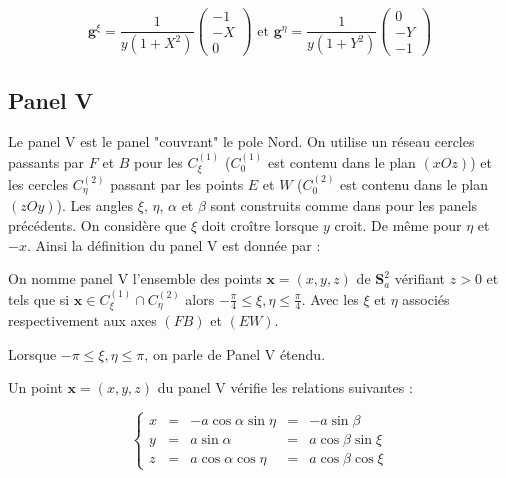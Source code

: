 \begin{equation}
\mathbf{g}^{\xi} = \dfrac{1}{y(1+X^2)}\begin{pmatrix}
-1 \\ -X \\ 0
\end{pmatrix} \text{ et } \mathbf{g}^{\eta} = \dfrac{1}{y(1+Y^2)}\begin{pmatrix}
0 \\ -Y \\ -1
\end{pmatrix}
\label{eq: base duale IV}
\end{equation}













\subsection{Panel V}

Le panel V est le panel "couvrant" le pole Nord. On utilise un réseau cercles passants par $F$ et $B$ pour les $C_{\xi}^{(1)}$ ($C_{0}^{(1)}$ est contenu dans le plan $(xOz)$) et les cercles $C_{\eta}^{(2)}$ passant par les points $E$ et $W$ ($C_{0}^{(2)}$ est contenu dans le plan $(zOy)$). Les angles $\xi$, $\eta$, $\alpha$ et $\beta$ sont construits comme dans pour les panels précédents.  On considère que $\xi$ doit croître lorsque $y$ croit. De même pour $\eta$ et $-x$. Ainsi la définition du panel V est donnée par :

\begin{definition}
On nomme panel V l'ensemble des points $\mathbf{x}=(x,y,z)$ de $\mathbf{S}_a^2$ vérifiant $z>0$ et tels que si $\mathbf{x} \in C_{\xi}^{(1)} \cap C_{\eta}^{(2)}$ alors $-\frac{\pi}{4}\leq \xi,\eta \leq \frac{\pi}{4}$. Avec les $\xi$ et $\eta$ associés respectivement aux axes $(FB)$ et $(EW)$.

Lorsque $-\pi \leq \xi,\eta \leq \pi$, on parle de Panel V étendu.
\end{definition}

Un point $\mathbf{x}=(x,y,z)$ du panel V vérifie les relations suivantes :

\begin{equation}
\left\lbrace
\begin{array}{rcccc}
x & = & -a \cos \alpha \sin \eta & = & - a \sin \beta \\
y & = & a \sin \alpha & = & a \cos \beta \sin \xi \\
z & = & a \cos \alpha \cos \eta & = & a \cos \beta \cos \xi
\end{array}
\right.
\end{equation}

